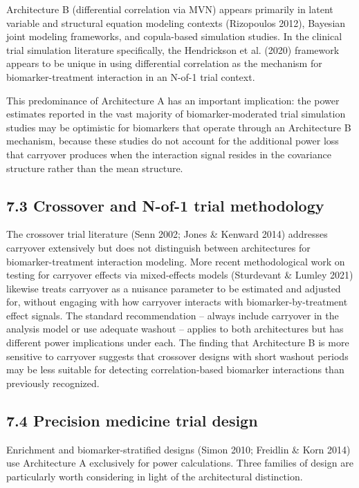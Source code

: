 \documentclass[
]{article}
\begin{document}
Architecture B (differential correlation via MVN) appears
primarily in latent variable and structural equation modeling
contexts (Rizopoulos 2012), Bayesian joint modeling frameworks,
and copula-based simulation studies. In the clinical trial
simulation literature specifically, the Hendrickson et al.
(2020) framework appears to be unique in using differential
correlation as the mechanism for biomarker-treatment
interaction in an N-of-1 trial context.

This predominance of Architecture A has an important implication:
the power estimates reported in the vast majority of
biomarker-moderated trial simulation studies may be optimistic
for biomarkers that operate through an Architecture B mechanism,
because these studies do not account for the additional power
loss that carryover produces when the interaction signal resides
in the covariance structure rather than the mean structure.

\subsection{7.3 Crossover and N-of-1 trial methodology}

The crossover trial literature (Senn 2002; Jones \& Kenward
2014) addresses carryover extensively but does not distinguish
between architectures for biomarker-treatment interaction
modeling. More recent methodological work on testing for
carryover effects via mixed-effects models (Sturdevant \& Lumley
2021) likewise treats carryover as a nuisance parameter to be
estimated and adjusted for, without engaging with how carryover
interacts with biomarker-by-treatment effect signals. The
standard recommendation -- always include carryover in the
analysis model or use adequate washout -- applies to both
architectures but has different power implications under each.
The finding that Architecture B is more sensitive to carryover
suggests that crossover designs with short washout periods may
be less suitable for detecting correlation-based biomarker
interactions than previously recognized.

\subsection{7.4 Precision medicine trial design}

Enrichment and biomarker-stratified designs (Simon 2010;
Freidlin \& Korn 2014) use Architecture A exclusively for power
calculations. Three families of design are particularly worth
considering in light of the architectural distinction.
\end{document}
